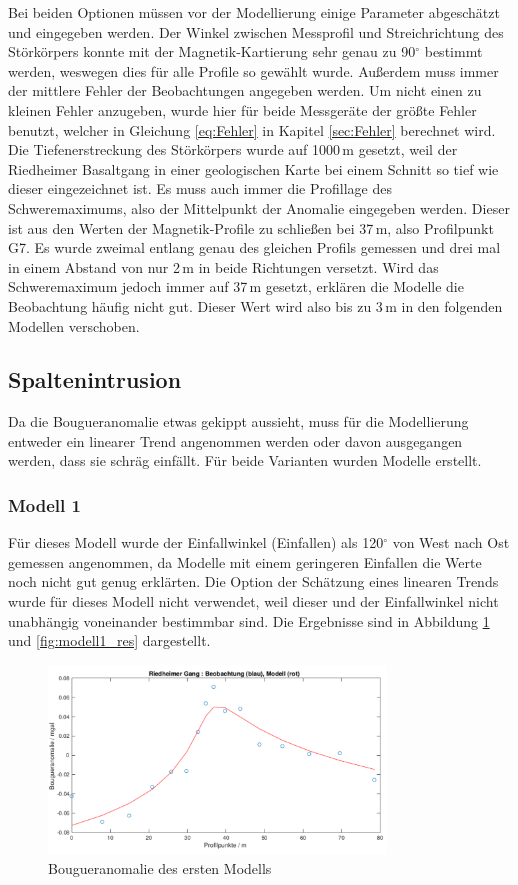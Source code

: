 Bei beiden Optionen müssen vor der Modellierung einige Parameter abgeschätzt und eingegeben werden. Der Winkel zwischen Messprofil und Streichrichtung des Störkörpers konnte mit der Magnetik-Kartierung sehr genau zu 90$^\circ$ bestimmt werden, weswegen dies für alle Profile so gewählt wurde. Außerdem muss immer der mittlere Fehler der Beobachtungen angegeben werden. Um nicht einen zu kleinen Fehler anzugeben, wurde hier für beide Messgeräte der größte Fehler benutzt, welcher in Gleichung \eqref{eq:Fehler} in Kapitel \ref{sec:Fehler} berechnet wird. Die Tiefenerstreckung des Störkörpers wurde auf 1000\,m gesetzt, weil der Riedheimer Basaltgang in einer geologischen Karte bei einem Schnitt so tief wie dieser eingezeichnet ist. Es muss auch immer die Profillage des Schweremaximums, also der Mittelpunkt der Anomalie eingegeben werden. Dieser ist aus den Werten der Magnetik-Profile zu schließen bei 37\,m, also Profilpunkt G7. Es wurde zweimal entlang genau des gleichen Profils gemessen und drei mal in einem Abstand von nur 2\,m in beide Richtungen versetzt. Wird das Schweremaximum jedoch immer auf 37\,m gesetzt, erklären die Modelle die Beobachtung häufig nicht gut. Dieser Wert wird also bis zu 3\,m in den folgenden Modellen verschoben.

\subsection{Spaltenintrusion}

Da die Bougueranomalie etwas gekippt aussieht, muss für die Modellierung entweder ein linearer Trend angenommen werden oder davon ausgegangen werden, dass sie schräg einfällt. Für beide Varianten wurden Modelle erstellt.

\subsubsection{Modell 1}

Für dieses Modell wurde der Einfallwinkel (Einfallen) als 120$^\circ$ von West nach Ost gemessen angenommen, da Modelle mit einem geringeren Einfallen die Werte noch nicht gut genug erklärten. Die Option der Schätzung eines linearen Trends wurde für dieses Modell nicht verwendet, weil dieser und der Einfallwinkel nicht unabhängig voneinander bestimmbar sind. Die Ergebnisse sind in Abbildung \ref{fig:modell1} und \ref{fig:modell1_res} dargestellt.

\begin{figure}[!ht]
 \centering
 \includegraphics[width=0.8\textwidth]{fig/modell1}
 \caption{Bougueranomalie des ersten Modells}
 \label{fig:modell1}
\end{figure}

